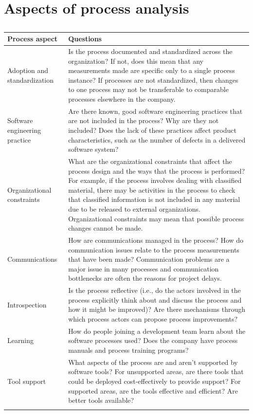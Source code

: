 \section{Aspects of process analysis}
\begin{longtable}{ |p{2cm}|p{10cm}|  }
\hline
Process aspect & Questions \\
\hline
\hline
Adoption and standardization & Is the process documented and standardized across the organization? If not, does this mean that any measurements made are specific only to a single process instance? If processes are not standardized, then changes to one process may not be transferable to comparable processes elsewhere in the company.\\
\hline
Software engineering practice & Are there known, good software engineering practices that are not included in the process? Why are they not included? Does the lack of these practices affect product characteristics, such as the number of defects in a delivered software system?\\
\hline
Organizational constraints & What are the organizational constraints that affect the process design and the ways that the process is performed? For example, if the process involves dealing with classified material, there may be activities in the process to check that classified information is not included in any material due to be released to external organizations. Organizational constraints may mean that possible process changes cannot be made.\\
\hline
Communications & How are communications managed in the process? How do communication issues relate to the process measurements that have been made? Communication problems are a major issue in many processes and communication bottlenecks are often the reasons for project delays.\\
\hline
Introspection & Is the process reflective (i.e., do the actors involved in the process explicitly think about and discuss the process and how it might be improved)? Are there mechanisms through which process actors can propose process improvements?\\
\hline
Learning & How do people joining a development team learn about the software processes used? Does the company have process manuals and process training programs?\\
\hline
Tool support & What aspects of the process are and aren’t supported by software tools? For unsupported areas, are there tools that could be deployed cost-effectively to provide support? For supported areas, are the tools effective and efficient? Are better tools available?\\
\hline
\caption{}
\label{table:T9_2}
\end{longtable}

